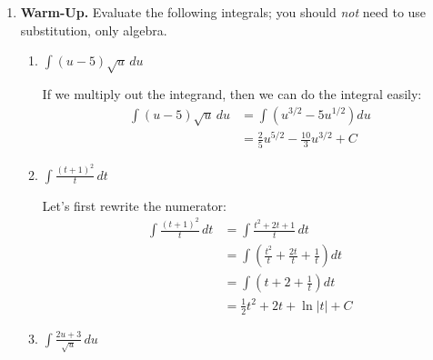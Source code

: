 \documentclass[main]{subfiles}
\begin{document}
\begin{enumerate}
\item 


  \textbf{Warm-Up.}  Evaluate the following integrals; you should
  \textit{not} need to use substitution, only algebra.

  \probonly{}
    \begin{enumerate}
    \item
      \begin{problem}[\stretch{0.5}]
        $\displaystyle \int (u - 5) \sqrt{u}\,du$
      \end{problem}

      \begin{solution} %
        If we multiply out the integrand, then we can do the integral
        easily: 
        \begin{align*}
          \int (u -5) \sqrt{u}\,du 
          & =  \int \left( u^{3/2} -5 u^{1/2} \right) du \\
          & =  \boxed{\frac{2}{5}u^{5/2} - \frac{10}{3} u^{3/2} + C} 
        \end{align*}
      \end{solution}

    \item
      \begin{problem}[\stretch{0.5}]
        $\displaystyle \int \frac{(t + 1)^2}{t}\,dt$
      \end{problem}

      \begin{solution}
        Let's first rewrite the numerator: 
        \begin{align*}
          \int \frac{(t + 1)^2}{t}\,dt &= \int \frac{t^2 + 2t + 1}{t}\,dt \\
          &= \int \left( \frac{t^2}{t} + \frac{2t}{t} + \frac{1}{t}
          \right) dt \\
          &= \int \left( t + 2 + \frac{1}{t} \right) dt \\
          &= \boxed{\frac{1}{2} t^2 + 2t + \ln |t| + C}
        \end{align*}
      \end{solution}

    \item
      \begin{problem}[\nstretch{0.5}]
        $\displaystyle \int \frac{2u + 3}{\sqrt{u}}\,du$
      \end{problem}


\end{enumerate}
\end{enumerate}
\end{document}
